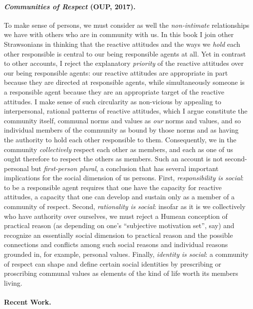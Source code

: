 \documentclass[%
  11pt,%
]{article}
\begin{document}
\paragraph{\emph{Communities of Respect} (OUP, 2017).}

To make sense of persons, we must consider as well the \emph{non-intimate} relationships we have with others who are in community with us. In this book I join other Strawsonians in thinking that the reactive attitudes and the ways we \emph{hold} each other responsible is central to our being responsible agents at all. Yet in contrast to other accounts, I reject the explanatory \emph{priority} of the reactive attitudes over our being responsible agents: our reactive attitudes are appropriate in part because they are directed at responsible agents, while simultaneously someone is a responsible agent because they are an appropriate target of the reactive attitudes. I make sense of such circularity as non-vicious by appealing to interpersonal, rational patterns of reactive attitudes, which I argue constitute the community itself, communal norms and values as \emph{our} norms and values, and so individual members of the community as bound by those norms and as having the authority to hold each other responsible to them. Consequently, we in the community \emph{collectively} respect each other as members, and each as one of us ought therefore to respect the others as members. Such an account is not second-personal but \emph{first-person plural}, a conclusion that has several important implications for the social dimension of us persons. First, \emph{responsibility is social}: to be a responsible agent requires that one have the capacity for reactive attitudes, a capacity that one can develop and sustain only as a member of a community of respect. Second, \emph{rationality is social}: insofar as it is we collectively who have authority over ourselves, we must reject a Humean conception of practical reason (as depending on one's \enquote{subjective motivation set}, say) and recognize an essentially social dimension to practical reason and the possible connections and conflicts among such social reasons and individual reasons grounded in, for example, personal values. Finally, \emph{identity is social}: a community of respect can shape and define certain social identities by prescribing or proscribing communal values as elements of the kind of life worth its members living.

\paragraph{Recent Work.}
\end{document}
